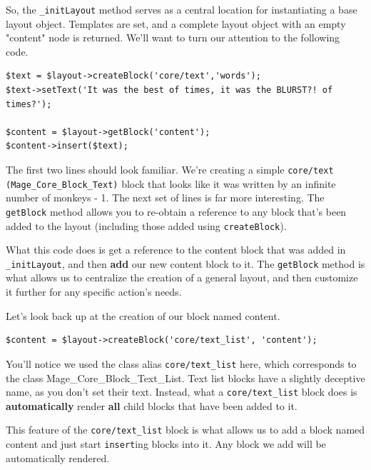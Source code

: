 \documentclass[oneside]{book}
\begin{document}
So, the \footnotesize\texttt{\_initLayout} \normalsize  method serves as a central location for instantiating a base layout object.  Templates are set, and a complete layout object with an empty "content" node is returned.  We'll want to turn our attention to the following code.

\begin{lstlisting}
$text = $layout->createBlock('core/text','words');
$text->setText('It was the best of times, it was the BLURST?! of times?');

$content = $layout->getBlock('content');
$content->insert($text);

\end{lstlisting}


The first two lines should look familiar.  We're creating a simple \footnotesize\texttt{core/text (Mage\_Core\_Block\_Text)} \normalsize  block that looks like it was written by an infinite number of monkeys - 1.  The next set of lines is far more interesting.  The \footnotesize\texttt{getBlock} \normalsize  method allows you to re-obtain a reference to any block that's been added to the layout (including those added using \footnotesize\texttt{createBlock}\normalsize).  

What this code does is get a reference to the content block that was added in \footnotesize\texttt{\_initLayout}\normalsize, and then \textbf{add} our new content block to it.  The \footnotesize\texttt{getBlock} \normalsize  method is what allows us to centralize the creation of a general layout, and then customize it further for any specific action's needs.  

Let's look back up at the creation of our block named content.

\begin{lstlisting}
$content = $layout->createBlock('core/text_list', 'content');           

\end{lstlisting}


You'll notice we used the class alias \footnotesize\texttt{core/text\_list} \normalsize  here, which corresponds to the class Mage\_Core\_Block\_Text\_List.  Text list blocks have a slightly deceptive name, as you don't set their text.  Instead, what a \footnotesize\texttt{core/text\_list} \normalsize  block does is \textbf{automatically} render \textbf{all} child blocks that have been added to it.  

This feature of the \footnotesize\texttt{core/text\_list} \normalsize  block is what allows us to add a block named content and just start \footnotesize\texttt{insert}\normalsize ing blocks into it.  Any block we add will be automatically rendered.
\end{document}
